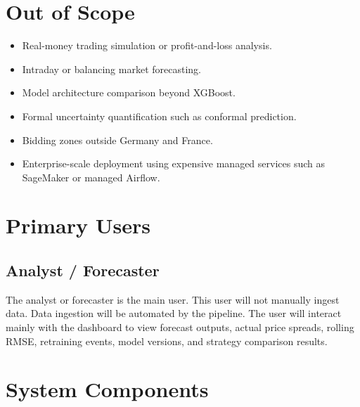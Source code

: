\documentclass[12pt,a4paper]{article}
\begin{document}
\section{Out of Scope}

\begin{itemize}
    \item Real-money trading simulation or profit-and-loss analysis.
    \item Intraday or balancing market forecasting.
    \item Model architecture comparison beyond XGBoost.
    \item Formal uncertainty quantification such as conformal prediction.
    \item Bidding zones outside Germany and France.
    \item Enterprise-scale deployment using expensive managed services such as SageMaker or managed Airflow.
\end{itemize}

\section{Primary Users}

\subsection{Analyst / Forecaster}

The analyst or forecaster is the main user. This user will not manually ingest data. Data ingestion will be automated by the pipeline. The user will interact mainly with the dashboard to view forecast outputs, actual price spreads, rolling RMSE, retraining events, model versions, and strategy comparison results.

\section{System Components}
\end{document}
